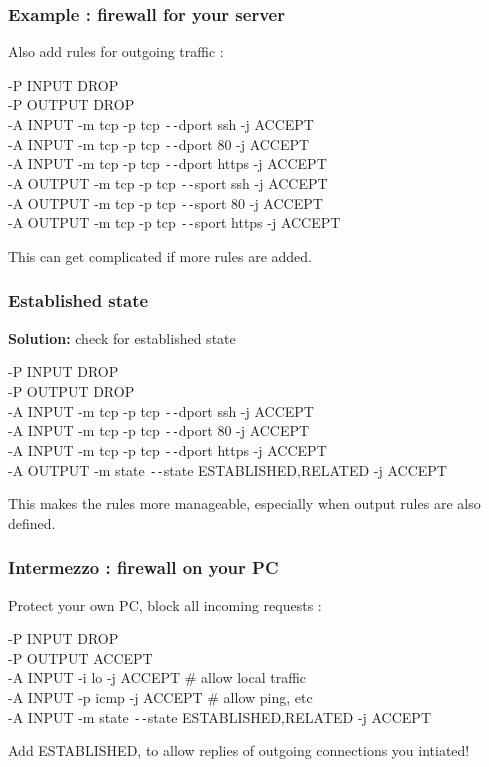 \documentclass[14pt]{beamer}
\newcommand{\dd}{{\texttt{-{}-}}}
\begin{document}
  \begin{frame}
    \frametitle{Example : firewall for your server}
    Also add rules for outgoing traffic :
    \begin{example}
      \small{-P INPUT DROP\\
      -P OUTPUT DROP\\
      -A INPUT -m tcp -p tcp \dd dport ssh -j ACCEPT\\
      -A INPUT -m tcp -p tcp \dd dport 80 -j ACCEPT\\
      -A INPUT -m tcp -p tcp \dd dport https -j ACCEPT\\
      {\color{blue}-A OUTPUT -m tcp -p tcp \dd sport ssh -j ACCEPT\\
      -A OUTPUT -m tcp -p tcp \dd sport 80 -j ACCEPT\\
      -A OUTPUT -m tcp -p tcp \dd sport https -j ACCEPT}}
    \end{example}
    \pause
    This can get complicated if more rules are added.
  \end{frame}
  \begin{frame}
    \frametitle{Established state}
    \textbf{Solution:} check for established state
    \begin{example}
      \small{-P INPUT DROP\\
      -P OUTPUT DROP\\
      -A INPUT -m tcp -p tcp \dd dport ssh -j ACCEPT\\
      -A INPUT -m tcp -p tcp \dd dport 80 -j ACCEPT\\
      -A INPUT -m tcp -p tcp \dd dport https -j ACCEPT\\
      {\color{blue}-A OUTPUT -m state \dd state ESTABLISHED,RELATED -j ACCEPT}}
    \end{example}
    This makes the rules more manageable, especially when output rules are also defined.
  \end{frame}
  \begin{frame}
    \frametitle{Intermezzo : firewall on your PC}
    Protect your own PC, block all incoming requests :
    \begin{example}
      \small{-P INPUT DROP\\
      -P OUTPUT ACCEPT}\\
      \pause
      \small{-A INPUT -i lo -j ACCEPT \# allow local traffic\\
      -A INPUT -p icmp -j ACCEPT \# allow ping, etc\\
      -A INPUT -m state \dd state ESTABLISHED,RELATED -j ACCEPT}
    \end{example}
    Add ESTABLISHED, to allow replies of outgoing connections you intiated!
  \end{frame}
\end{document}
